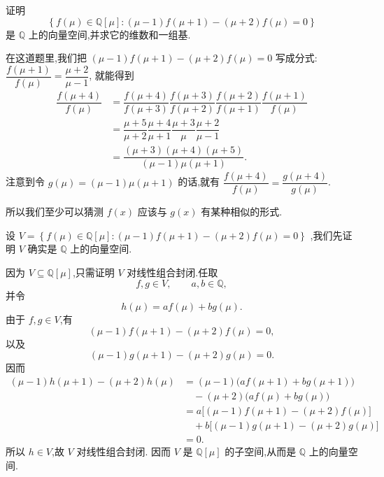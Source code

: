 \begin{problem}
    证明
    \[
        \left\{
        f(\mu)\in\mathbb{Q}[\mu]:
        (\mu-1)f(\mu+1)-(\mu+2)f(\mu)=0
        \right\}
    \]
    是 $\mathbb{Q}$ 上的向量空间,并求它的维数和一组基.
    \begin{solution}
        \begin{solnote}
            在这道题里,我们把 $(\mu-1)f(\mu+1)-(\mu+2)f(\mu)=0$ 写成分式: $\dfrac{f(\mu+1)}{f(\mu)} = \dfrac{\mu + 2}{\mu - 1}$,
            就能得到
            \begin{align}
                \dfrac{f(\mu + 4)}{f(\mu)}
                &=  \dfrac{f(\mu + 4)}{f(\mu + 3)}
                    \dfrac{f(\mu + 3)}{f(\mu + 2)}
                    \dfrac{f(\mu + 2)}{f(\mu + 1)}
                    \dfrac{f(\mu + 1)}{f(\mu)} \\
                &=  \dfrac{\mu + 5}{\mu + 2}
                    \dfrac{\mu + 4}{\mu + 1}
                    \dfrac{\mu + 3}{\mu}
                    \dfrac{\mu + 2}{\mu - 1} \\
                &= \dfrac{(\mu + 3)(\mu + 4)(\mu + 5)}{(\mu - 1)\mu(\mu + 1)}.\label{eq:mu-shift-ratio}
            \end{align}
            注意到令 $g(\mu) = (\mu - 1)\mu(\mu + 1)$ 的话,就有 $\dfrac{f(\mu + 4)}{f(\mu)} = \dfrac{g(\mu + 4)}{g(\mu)}$.
            
            所以我们至少可以猜测 $f(x)$ 应该与 $g(x)$ 有某种相似的形式.  
        \end{solnote}

        设 $V = \left\{
        f(\mu)\in\mathbb{Q}[\mu]:
        (\mu-1)f(\mu+1)-(\mu+2)f(\mu)=0
        \right\}$ ,我们先证明 $V$ 确实是 $\mathbb{Q}$ 上的向量空间.

        因为 $V\subseteq \mathbb{Q}[\mu]$,只需证明 $V$ 对线性组合封闭.任取
        \[
            f,g\in V,\qquad a,b\in\mathbb{Q},
        \]
        并令
        \[
            h(\mu)=af(\mu)+bg(\mu).
        \]
        由于 $f,g\in V$,有
        \[
            (\mu-1)f(\mu+1)-(\mu+2)f(\mu)=0,
        \]
        以及
        \[
            (\mu-1)g(\mu+1)-(\mu+2)g(\mu)=0.
        \]
        因而
        \begin{align*}
            (\mu-1)h(\mu+1)-(\mu+2)h(\mu)
            &= (\mu-1)\bigl(af(\mu+1)+bg(\mu+1)\bigr) \\
            &\quad - (\mu+2)\bigl(af(\mu)+bg(\mu)\bigr) \\
            &= a\bigl[(\mu-1)f(\mu+1)-(\mu+2)f(\mu)\bigr] \\
            &\quad + b\bigl[(\mu-1)g(\mu+1)-(\mu+2)g(\mu)\bigr] \\
            &= 0.
        \end{align*}
        所以 $h\in V$,故 $V$ 对线性组合封闭.
        因而 $V$ 是 $\mathbb{Q}[\mu]$ 的子空间,从而是 $\mathbb{Q}$ 上的向量空间.


\end{solution}
\end{problem}
